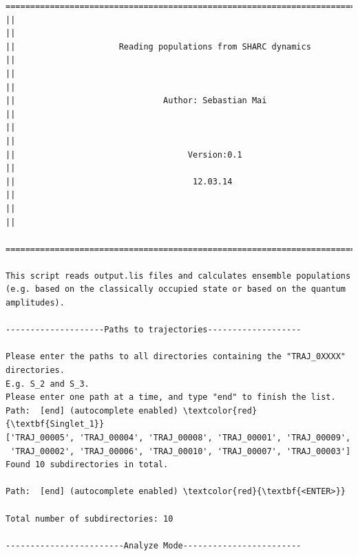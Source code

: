 \documentclass[a4paper,11pt,DIV=15,openany]{scrbook}
\newcommand{\ttt}[1]{\textbf{\texttt{#1}}}
\begin{document}
% 
% 
\begin{oframed}
\footnotesize\begin{Verbatim}[commandchars=\\\{\}]
  ================================================================================  
||                                                                                ||
||                     Reading populations from SHARC dynamics                    ||
||                                                                                ||
||                              Author: Sebastian Mai                             ||
||                                                                                ||
||                                   Version:0.1                                  ||
||                                    12.03.14                                    ||
||                                                                                ||
  ================================================================================  

This script reads output.lis files and calculates ensemble populations 
(e.g. based on the classically occupied state or based on the quantum amplitudes).
  
--------------------Paths to trajectories-------------------

Please enter the paths to all directories containing the "TRAJ_0XXXX" directories.
E.g. S_2 and S_3. 
Please enter one path at a time, and type "end" to finish the list.
Path:  [end] (autocomplete enabled) \textcolor{red}{\textbf{Singlet_1}}
['TRAJ_00005', 'TRAJ_00004', 'TRAJ_00008', 'TRAJ_00001', 'TRAJ_00009', 
 'TRAJ_00002', 'TRAJ_00006', 'TRAJ_00010', 'TRAJ_00007', 'TRAJ_00003']
Found 10 subdirectories in total.

Path:  [end] (autocomplete enabled) \textcolor{red}{\textbf{<ENTER>}}

Total number of subdirectories: 10

------------------------Analyze Mode------------------------


\end{Verbatim}
\end{oframed}
\end{document}
